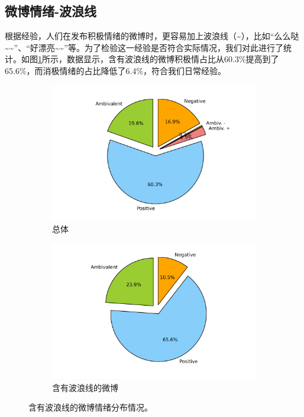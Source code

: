 \documentclass[12pt, oneside]{article}
\begin{document}
\begin{spacing}{1.5}
\begin{CJK}{UTF8}{gbsn}
\subsection{微博情绪-波浪线}

根据经验，人们在发布积极情绪的微博时，更容易加上波浪线（\~{}），比如“么么哒\~{}\~{}”、“好漂亮\~{}\~{}”等。为了检验这一经验是否符合实际情况，我们对此进行了统计。如图\ref{fig:emotion_tilde}所示，数据显示，含有波浪线的微博积极情占比从60.3\%提高到了65.6\%，而消极情绪的占比降低了6.4\%，符合我们日常经验。

\begin{figure}
	\centering
	\begin{subfigure}[b]{0.45\linewidth}
		\centering
		\includegraphics[trim = 1.5cm 0 1.5cm 0, clip = true, width=\textwidth]{../result/charts/emotion_identification_all}
		\caption{总体}
	\end{subfigure}
	\begin{subfigure}[b]{0.45\linewidth}
		\centering
		\includegraphics[trim = 1.5cm 0 1.5cm 0, clip = true, width=\textwidth]{../result/charts/emotion_tilde}
		\caption{含有波浪线的微博}
	\end{subfigure}
	\caption{含有波浪线的微博情绪分布情况。}
	\label{fig:emotion_tilde}
\end{figure}


\end{CJK}
\end{spacing}
\end{document}
